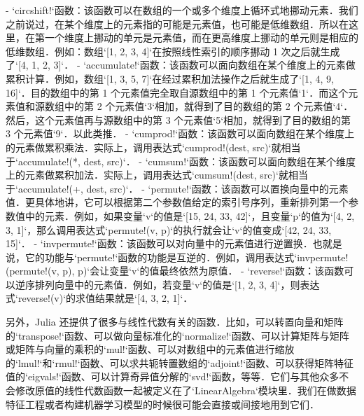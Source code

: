 - `circshift!`函数：该函数可以在数组的一个或多个维度上循环式地挪动元素．我们之前说过，在某个维度上的元素指的可能是元素值，也可能是低维数组．所以在这里，在第一个维度上挪动的单元是元素值，而在更高维度上挪动的单元则是相应的低维数组．例如：数组`[1, 2, 3, 4]`在按照线性索引的顺序挪动 1 次之后就生成了`[4, 1, 2, 3]`．
- `accumulate!`函数：该函数可以面向数组在某个维度上的元素做累积计算．例如，数组`[1, 3, 5, 7]`在经过累积加法操作之后就生成了`[1, 4, 9, 16]`．目的数组中的第 1 个元素值完全取自源数组中的第 1 个元素值`1`．而这个元素值和源数组中的第 2 个元素值`3`相加，就得到了目的数组的第 2 个元素值`4`．然后，这个元素值再与源数组中的第 3 个元素值`5`相加，就得到了目的数组的第 3 个元素值`9`．以此类推．
- `cumprod!`函数：该函数可以面向数组在某个维度上的元素做累积乘法．实际上，调用表达式`cumprod!(dest, src)`就相当于`accumulate!(*, dest, src)`．
- `cumsum!`函数：该函数可以面向数组在某个维度上的元素做累积加法．实际上，调用表达式`cumsum!(dest, src)`就相当于`accumulate!(+, dest, src)`．
- `permute!`函数：该函数可以置换向量中的元素值．更具体地讲，它可以根据第二个参数值给定的索引号序列，重新排列第一个参数值中的元素．例如，如果变量`v`的值是`[15, 24, 33, 42]`，且变量`p`的值为`[4, 2, 3, 1]`，那么调用表达式`permute!(v, p)`的执行就会让`v`的值变成`[42, 24, 33, 15]`．
- `invpermute!`函数：该函数可以对向量中的元素值进行逆置换．也就是说，它的功能与`permute!`函数的功能是互逆的．例如，调用表达式`invpermute!(permute!(v, p), p)`会让变量`v`的值最终依然为原值．
- `reverse!`函数：该函数可以逆序排列向量中的元素值．例如，若变量`v`的值是`[1, 2, 3, 4]`，则表达式`reverse!(v)`的求值结果就是`[4, 3, 2, 1]`．

另外，Julia 还提供了很多与线性代数有关的函数．比如，可以转置向量和矩阵的`transpose!`函数、可以做向量标准化的`normalize!`函数、可以计算矩阵与矩阵或矩阵与向量的乘积的`mul!`函数、可以对数组中的元素值进行缩放的`lmul!`和`rmul!`函数、可以求共轭转置数组的`adjoint!`函数、可以获得矩阵特征值的`eigvals!`函数、可以计算奇异值分解的`svd!`函数，等等．它们与其他众多不会修改原值的线性代数函数一起被定义在了`LinearAlgebra`模块里．我们在做数据特征工程或者构建机器学习模型的时候很可能会直接或间接地用到它们．